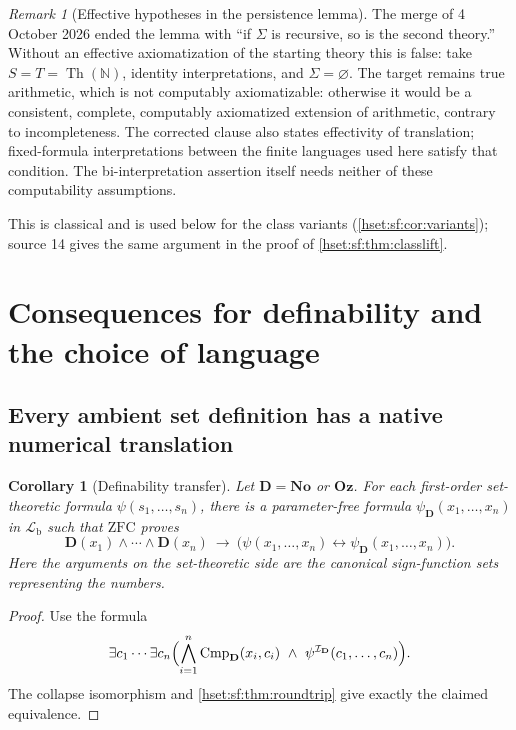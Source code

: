 \documentclass[11pt,letterpaper]{article}
\newtheorem{corollary}[corollary]{Corollary}\aliascntresetthe{corollary}
\theoremstyle{definition}
\theoremstyle{remark}
\newtheorem{remark}[remark]{Remark}\aliascntresetthe{remark}
\newcommand{\No}{\mathbf{No}}
\newcommand{\I}{\mathcal I}
\newcommand{\ZFC}{\mathrm{ZFC}}
\newcommand{\Oz}{\mathbf{Oz}}
\newcommand{\Cmp}{\operatorname{Cmp}}
\newcommand{\Dd}{\mathbf{D}}
\newcommand{\Lb}{\mathcal L_{\mathrm b}}
\begin{document}
\begin{remark}[Effective hypotheses in the persistence lemma]
\label{hset:sf:rem:persistence-effectivity}
The merge of 4 October 2026 ended the lemma with ``if $\Sigma$ is recursive,
so is the second theory.'' Without an effective axiomatization of the
starting theory this is false: take $S=T=\operatorname{Th}(\mathbb N)$,
identity interpretations, and $\Sigma=\varnothing$. The target remains true
arithmetic, which is not computably axiomatizable: otherwise it would be a
consistent, complete, computably axiomatized extension of arithmetic,
contrary to incompleteness. The corrected clause also states effectivity
of translation; fixed-formula interpretations between the finite languages
used here satisfy that condition. The bi-interpretation assertion itself
needs neither of these computability assumptions.
\end{remark}

This is classical and is used below for the class variants
(\cref{hset:sf:cor:variants}); source 14 gives the same argument in the proof of
\cref{hset:sf:thm:classlift}.

\section{Consequences for definability and the choice of language}
\label{hset:sf:sec:language}

\subsection{Every ambient set definition has a native numerical translation}

\begin{corollary}[Definability transfer]\label{hset:sf:cor:definability}
Let $\Dd=\No$ or $\Oz$. For each first-order set-theoretic formula
$\psi(s_1,\ldots,s_n)$, there is a parameter-free formula
$\psi_{\Dd}(x_1,\ldots,x_n)$ in $\Lb$ such that $\ZFC$ proves
\[
 \Dd(x_1)\land\cdots\land \Dd(x_n)\ \longrightarrow\
 \bigl(\psi(x_1,\ldots,x_n)\leftrightarrow\psi_{\Dd}(x_1,\ldots,x_n)\bigr).
\]
Here the arguments on the set-theoretic side are the canonical sign-function sets
representing the numbers.
\end{corollary}
\begin{proof}
Use the formula
\[
 \exists c_1\cdots\exists c_n\Bigl(\bigwedge_{i=1}^{n}\Cmp_{\Dd}(x_i,c_i)
 \ \land\ \psi^{\I_{\Dd}}(c_1,\ldots,c_n)\Bigr).
\]
The collapse isomorphism and \cref{hset:sf:thm:roundtrip} give exactly the claimed
equivalence.
\end{proof}
\end{document}
